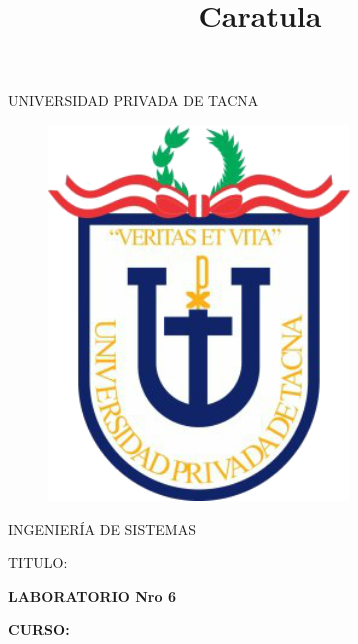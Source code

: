 \documentclass[12pt,letterpaper]{article}
\begin{document}
%


\title{Caratula}

\begin{titlepage}
\begin{center}
\large{UNIVERSIDAD PRIVADA DE TACNA}\\
\vspace*{-0.025in}
\begin{figure}[htb]
\begin{center}
\includegraphics[width=8cm]{./Imagenes/logo}
\end{center}
\end{figure}
\vspace*{0.15in}
INGENIERÍA DE SISTEMAS  \\

\vspace*{0.5in}
\begin{large}
TITULO:\\
\end{large}

\vspace*{0.1in}
\begin{Large}
\textbf{LABORATORIO Nro 6} \\
\end{Large}

\vspace*{0.3in}
\begin{Large}
\textbf{CURSO:} \\
\end{Large}


\end{center}
\end{titlepage}
\end{document}
